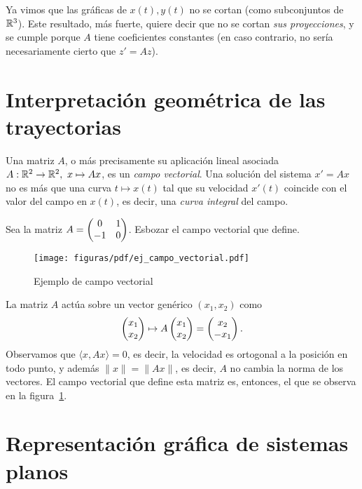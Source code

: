 \documentclass[../ecuaciones_diferenciales.tex]{subfiles}
\begin{document}
\begin{remark}
	Ya vimos que las gráficas de \(x(t), y(t)\) no se cortan (como subconjuntos de
	\(\mathbb{R}^3\)). Este resultado, más fuerte, quiere decir que no se cortan \emph{sus
		proyecciones}, y se cumple porque \(A\) tiene coeficientes constantes (en
	caso contrario, no sería necesariamente cierto que \(z' = Az\)).
\end{remark}

\section{Interpretación geométrica de las trayectorias}

Una matriz \(A\), o más precisamente su aplicación lineal asociada \(A : \mathbb{R}^2
\to \mathbb{R}^2,\ x \mapsto Ax\), es un \emph{campo vectorial}. Una solución del
sistema \(x' = Ax\) no es más que una curva \(t \mapsto x(t)\) tal que su
velocidad \(x'(t)\) coincide con el valor del campo en \(x(t)\), es decir, una
\emph{curva integral} del campo.

\begin{example}
	Sea la matriz \(A = \begin{pmatrix}0 & 1 \\ -1 & 0\end{pmatrix}\). Esbozar el campo vectorial que
	define.
\end{example}

\begin{figure}[ht]
	\centering
	\texttt{[image: figuras/pdf/ej\_campo\_vectorial.pdf]}
	\caption{Ejemplo de campo vectorial}\label{fig:campo_vec}
\end{figure}

\begin{solution}
	La matriz \(A\) actúa sobre un vector genérico \((x_1, x_2)\) como
	\[\begin{pmatrix}x_1 \\ x_2\end{pmatrix} \mapsto A\begin{pmatrix}x_1 \\ x_2\end{pmatrix} = \begin{pmatrix}x_2 \\ -x_1\end{pmatrix}.\]
	Observamos que \(\langle x, Ax \rangle = 0\), es decir, la velocidad es
	ortogonal a la posición en todo punto, y además \(\|x\| = \|Ax\|\), es decir,
	\(A\) no cambia la norma de los vectores. El campo vectorial que define esta
	matriz es, entonces, el que se observa en la figura~\ref{fig:campo_vec}.
\end{solution}

\section{Representación gráfica de sistemas planos}
\end{document}
